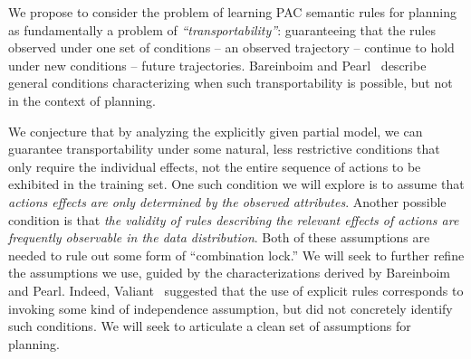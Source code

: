\documentclass[12pt]{article}
\begin{document}
We propose to consider the problem of learning PAC semantic rules for planning as fundamentally a problem of {\em ``transportability''}: guaranteeing that the rules observed under one set of conditions -- an observed trajectory -- continue to hold under new conditions -- future trajectories. Bareinboim and Pearl~\cite{bareinboim2012completeness,bareinboim2013algorithm} describe general conditions characterizing when such transportability is possible, but not in the context of planning. 


We conjecture that by analyzing the explicitly given partial model, we can guarantee transportability under some natural, less restrictive conditions that only require the individual effects, not the entire sequence of actions to be exhibited in the training set. 
One such condition we will explore is to assume that {\em actions effects are only determined by the observed attributes}. Another possible condition is that {\em the validity of rules describing the relevant effects of actions are frequently observable in the data distribution}. Both of these assumptions are needed to rule out some form of ``combination lock.'' We will seek to further refine the assumptions we use, guided by the characterizations derived by Bareinboim and Pearl. Indeed, Valiant~\cite{valiant2006knowledgeInfusion} suggested that the use of explicit rules corresponds to invoking some kind of independence assumption, but did not concretely identify such conditions. We will seek to articulate a clean set of assumptions for planning.




\end{document}
